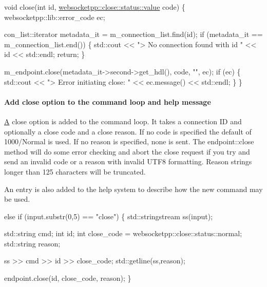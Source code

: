 \begin{DoxyCode}
\textcolor{keywordtype}{void} close(\textcolor{keywordtype}{int} \textcolor{keywordtype}{id}, \mbox{\hyperlink{namespacewebsocketpp_1_1close_1_1status_a8614a5c4733d708e2d2a32191c5bef84}{websocketpp::close::status::value}} code) \{
    websocketpp::lib::error\_code ec;

    con\_list::iterator metadata\_it = m\_connection\_list.find(\textcolor{keywordtype}{id});
    \textcolor{keywordflow}{if} (metadata\_it == m\_connection\_list.end()) \{
        std::cout << \textcolor{stringliteral}{"> No connection found with id "} << \textcolor{keywordtype}{id} << std::endl;
        \textcolor{keywordflow}{return};
    \}

    m\_endpoint.close(metadata\_it->second->get\_hdl(), code, \textcolor{stringliteral}{""}, ec);
    \textcolor{keywordflow}{if} (ec) \{
        std::cout << \textcolor{stringliteral}{"> Error initiating close: "} << ec.message() << std::endl;
    \}
\}
\end{DoxyCode}


\paragraph*{Add close option to the command loop and help message}

\mbox{\hyperlink{struct_a}{A}} close option is added to the command loop. It takes a connection ID and optionally a close code and a close reason. If no code is specified the default of 1000/\+Normal is used. If no reason is specified, none is sent. The {\ttfamily endpoint\+::close} method will do some error checking and abort the close request if you try and send an invalid code or a reason with invalid U\+T\+F8 formatting. Reason strings longer than 125 characters will be truncated.

An entry is also added to the help system to describe how the new command may be used.


\begin{DoxyCode}
\textcolor{keywordflow}{else} \textcolor{keywordflow}{if} (input.substr(0,5) == \textcolor{stringliteral}{"close"}) \{
    std::stringstream ss(input);

    std::string cmd;
    \textcolor{keywordtype}{int} id;
    \textcolor{keywordtype}{int} close\_code = websocketpp::close::status::normal;
    std::string reason;

    ss >> cmd >> \textcolor{keywordtype}{id} >> close\_code;
    std::getline(ss,reason);

    endpoint.close(\textcolor{keywordtype}{id}, close\_code, reason);
\}
\end{DoxyCode}


